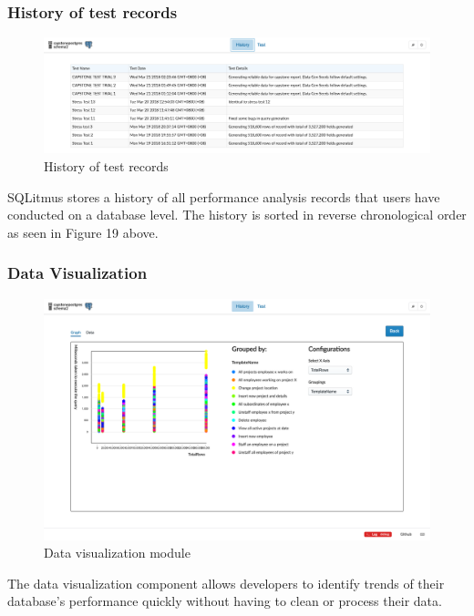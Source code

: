 \documentclass[12pt]{article}
\begin{document}
\begin{spacing}{1.9}
	\subsubsection{History of test records}
	
	\begin{figure}[H]
		\centering
		\includegraphics[width=\textwidth]{3-6-1.png}
		\caption{History of test records }
		
	\end{figure}
	
	SQLitmus stores a history of all performance analysis records that users have conducted on a database level. The history is sorted in reverse chronological order as seen in Figure 19 above.
	
	\subsubsection{ Data Visualization}
	
	\begin{figure}[H]
		\centering
		\includegraphics[width=\textwidth]{3-6-2.png}
		\caption{Data visualization module }
		
	\end{figure}
	
	The data visualization component allows developers to identify trends of their database's performance quickly without having to clean or process their data.
	

\end{spacing}
\end{document}

